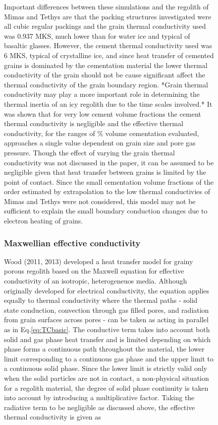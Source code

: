 \documentclass[11pt]{article} %
\begin{document}
\begin{figure}[ht]
	Important differences between these simulations and the regolith of Mimas and Tethys are that the packing structures investigated were all cubic regular packings and the grain thermal conductivity used was 0.937 MKS, much lower than for water ice and typical of basaltic glasses. However, the cement thermal conductivity used was 6 MKS, typical of crystalline ice, and since heat transfer of cemented grains is dominated by the cementation material the lower thermal conductivity of the grain should not be cause significant affect the thermal conductivity of the grain boundary region. *Grain thermal conductivity may play a more important role in determining the thermal inertia of an icy regolith due to the time scales involved.* It was shown that for very low cement volume fractions the cement thermal conductivity is negligible and the effective thermal conductivity, for the ranges of \% volume cementation evaluated, approaches a single value dependent on grain size and pore gas pressure. Though the effect of varying the grain thermal conductivity was not discussed in the paper, it can be assumed to be negligible given that heat transfer between grains is limited by the point of contact. Since the small cementation volume fractions of the order estimated by extrapolation to the low thermal conductivies of Mimas and Tethys were not considered, this model may not be sufficient to explain the small boundary conduction changes due to electron heating of grains.

\subsubsection{Maxwellian effective conductivity}
	 Wood (2011, 2013) developed a heat transfer model for grainy porous regolith based on the Maxwell equation for effective conductivity of an isotropic, heterogeneuos media. Although originally developed for electrical conductivity, the equation applies equally to thermal conductivity where the thermal paths - solid state conduction, convection through gas filled pores, and radiation from grain surfaces across pores - can be taken as acting in parallel as in Eq.\ref{eq:TCbasic}. The conductive term takes into account both solid and gas phase heat transfer and is limited depending on which phase forms a continuous path throughout the material, the lower limit corresponding to a continuous gas phase and the upper limit to a continuous solid phase. Since the lower limit is strictly valid only when the solid particles are not in contact, a non-physical situation for a regolith material, the degree of solid phase continuity is taken into account by introducing a multiplicative factor. Taking the radiative term to be negligible as discussed above, the effective thermal conductivity is given as
	

\end{figure}
\end{document}
